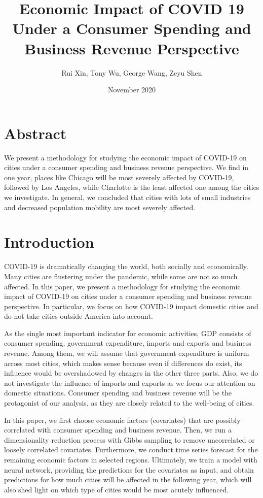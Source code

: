\documentclass{article}
\title{Economic Impact of COVID 19 Under a Consumer Spending and Business Revenue Perspective}
\author{Rui Xin, Tony Wu, George Wang, Zeyu Shen}
\date{November 2020}
\begin{document}
\maketitle

\section{Abstract}
We present a methodology for studying the economic impact of COVID-19 on cities under a consumer spending and business revenue perspective. We find in one year, places like Chicago will be most severely affected by COVID-19, followed by Los Angeles, while Charlotte is the least affected one among the cities we investigate. In general, we concluded that cities with lots of small industries and decreased population mobility are most severely affected.

\section{Introduction}
COVID-19 is dramatically changing the world, both socially and economically. Many cities are flustering under the pandemic, while some are not so much affected. In this paper, we present a methodology for studying the economic impact of COVID-19 on cities under a consumer spending and business revenue perspective. In particular, we focus on how COVID-19 impact domestic cities and do not take cities outside America into account.
\par
As the single most important indicator for economic activities, GDP consists of consumer spending, government expenditure, imports and exports and business revenue. Among them, we will assume that government expenditure is uniform across most cities, which makes sense because even if differences do exist, its influence would be overshadowed by changes in the other three parts. Also, we do not investigate the influence of imports and exports as we focus our attention on domestic situations. Consumer spending and business revenue will be the protagonist of our analysis, as they are closely related to the well-being of cities. 
\par
In this paper, we first choose economic factors (covariates) that are possibly correlated with consumer spending and business revenue. Then, we run a dimensionality reduction process with Gibbs sampling to remove uncorrelated or loosely correlated covariates. Furthermore, we conduct time series forecast for the remaining economic factors in selected regions. Ultimately, we train a model with neural network, providing the predictions for the covariates as input, and obtain predictions for how much cities will be affected in the following year, which will also shed light on which type of cities would be most acutely influenced.
\end{document}
